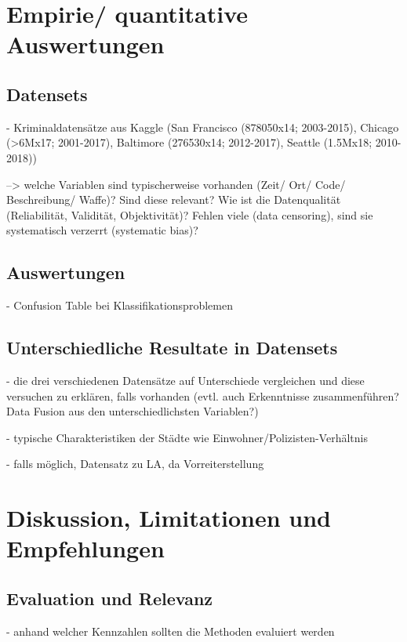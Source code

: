 \documentclass[a4paper,12pt,parskip,bibtotoc,liststotoc]{article}
\begin{document}
\newpage
\section{Empirie/ quantitative Auswertungen}

\subsection{Datensets}

- Kriminaldatensätze aus Kaggle (San Francisco (878050x14; 2003-2015), Chicago (>6Mx17; 2001-2017), Baltimore (276530x14; 2012-2017), Seattle (1.5Mx18; 2010-2018))

--> welche Variablen sind typischerweise vorhanden (Zeit/ Ort/ Code/ Beschreibung/ Waffe)? Sind diese relevant? Wie ist die Datenqualität (Reliabilität, Validität, Objektivität)? Fehlen viele (data censoring), sind sie systematisch verzerrt (systematic bias)?



\subsection{Auswertungen}  

- Confusion Table bei Klassifikationsproblemen

\subsection{Unterschiedliche Resultate in Datensets} 

- die drei verschiedenen Datensätze auf Unterschiede vergleichen und diese versuchen zu erklären, falls vorhanden (evtl. auch Erkenntnisse zusammenführen? Data Fusion aus den unterschiedlichsten Variablen?)

- typische Charakteristiken der Städte wie Einwohner/Polizisten-Verhältnis

- falls möglich, Datensatz zu LA, da Vorreiterstellung


\newpage
\section{Diskussion, Limitationen und Empfehlungen}

\subsection{Evaluation und Relevanz}

- anhand welcher Kennzahlen sollten die Methoden evaluiert werden
\end{document}

